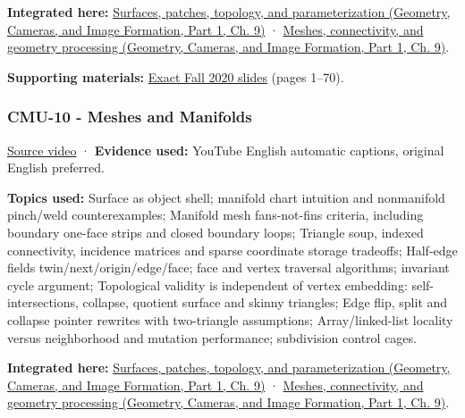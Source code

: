 \textbf{Integrated here:} \href{../03-Geometry-Cameras-and-Image-Formation-P01/main.pdf\#nameddest=03-visual-computing-i-ch002-surfaces-patches-topology-and-parameterization}{Surfaces, patches, topology, and parameterization (Geometry, Cameras, and Image Formation, Part 1, Ch. 9)} · \href{../03-Geometry-Cameras-and-Image-Formation-P01/main.pdf\#nameddest=03-visual-computing-i-ch002-meshes-connectivity-and-geometry-processing}{Meshes, connectivity, and geometry processing (Geometry, Cameras, and Image Formation, Part 1, Ch. 9)}.

\textbf{Supporting materials:} \href{https://15462.courses.cs.cmu.edu/fall2020content/lectures/09_introgeometry/09_introgeometry_slides.pdf}{Exact Fall 2020 slides} (pages 1--70).

\subsubsection{CMU-10 - Meshes and Manifolds}\label{04-visual-computing-ii-ch036-cmu-10---meshes-and-manifolds}

\hypertarget{04-visual-computing-ii-ch036-cmu-10---meshes-and-manifolds}{}

\href{https://www.youtube.com/watch?v=HePDHsp8spU}{Source video} · \textbf{Evidence used:} YouTube English automatic captions, original English preferred.

\textbf{Topics used:} Surface as object shell; manifold chart intuition and nonmanifold pinch/weld counterexamples; Manifold mesh fans-not-fins criteria, including boundary one-face strips and closed boundary loops; Triangle soup, indexed connectivity, incidence matrices and sparse coordinate storage tradeoffs; Half-edge fields twin/next/origin/edge/face; face and vertex traversal algorithms; invariant cycle argument; Topological validity is independent of vertex embedding: self-intersections, collapse, quotient surface and skinny triangles; Edge flip, split and collapse pointer rewrites with two-triangle assumptions; Array/linked-list locality versus neighborhood and mutation performance; subdivision control cages.

\textbf{Integrated here:} \href{../03-Geometry-Cameras-and-Image-Formation-P01/main.pdf\#nameddest=03-visual-computing-i-ch002-surfaces-patches-topology-and-parameterization}{Surfaces, patches, topology, and parameterization (Geometry, Cameras, and Image Formation, Part 1, Ch. 9)} · \href{../03-Geometry-Cameras-and-Image-Formation-P01/main.pdf\#nameddest=03-visual-computing-i-ch002-meshes-connectivity-and-geometry-processing}{Meshes, connectivity, and geometry processing (Geometry, Cameras, and Image Formation, Part 1, Ch. 9)}.

